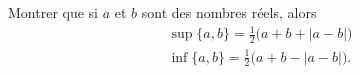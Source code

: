 

\begin{exercice}\label{exoINGE1114-0009}

	Montrer que si $a$ et $b$ sont des nombres réels, alors 
	\begin{subequations}
		\begin{align}
			\sup\{ a,b \}=\frac{ 1 }{2}\big( a+b+| a-b | \big)\\			\label{SubEqsupexoSerUnab}
			\inf\{ a,b \}=\frac{ 1 }{2}\big( a+b-| a-b | \big).
		\end{align}
	\end{subequations}

\end{exercice}
